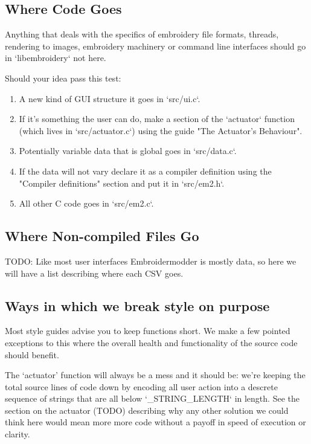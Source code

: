 \documentclass{report}
\begin{document}
\subsection{Where Code Goes}

Anything that deals with the specifics of embroidery file formats, threads, rendering to images, embroidery machinery or command line interfaces should go in `libembroidery` not here.

Should your idea pass this test:

\begin{enumerate}
\item A new kind of GUI structure it goes in `src/ui.c`.
\item If it's something the user can do, make a section of the `actuator` function (which lives in `src/actuator.c`) using the guide "The Actuator's Behaviour".
\item Potentially variable data that is global goes in `src/data.c`.
\item If the data will not vary declare it as a compiler definition using the "Compiler definitions" section and put it in `src/em2.h`.
\item All other C code goes in `src/em2.c`.
\end{enumerate}

\subsection{Where Non-compiled Files Go}

TODO: Like most user interfaces Embroidermodder is mostly data, so here we will have a list describing where each CSV goes.

\subsection{Ways in which we break style on purpose}

Most style guides advise you to keep functions short. We make a few pointed exceptions to this where the overall health and functionality of the source code should benefit.

The `actuator' function will always be a mess
and it should be: we're keeping the total source
lines of code down by encoding all user action into
a descrete sequence of strings that are all below
`\_STRING\_LENGTH` in length. See the section on
the actuator (TODO) describing why any other solution
we could think  here would mean more more code without
a payoff in speed of execution or clarity.
\end{document}
